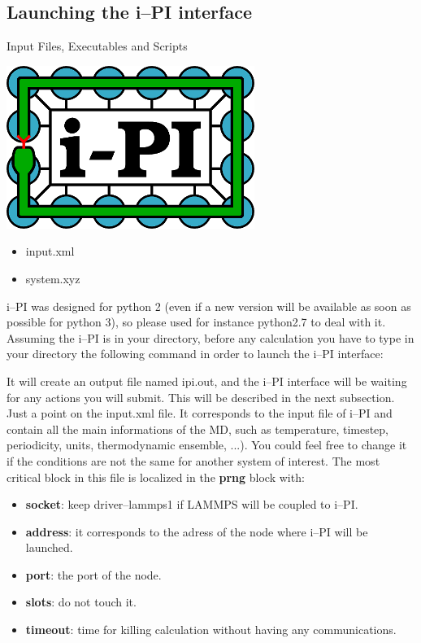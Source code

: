 \documentclass[12pt]{article}
\begin{document}
\subsection{Launching the i--PI interface}
\begin{mybox2}{{Input Files, Executables and Scripts}}
\begin{minipage}[c]{0.5\linewidth}
\includegraphics[scale=0.35]{ipi-logo-alpha.png}
\end{minipage}
\begin{minipage}[c]{0.5\linewidth}
\begin{itemize}
    \item input.xml
    \item system.xyz
\end{itemize}
\end{minipage}
\end{mybox2}
i--PI was designed for python 2 (even if a new version will be available as soon as possible for python 3), so please used for instance python2.7 to deal with it. Assuming the i--PI is in your directory, before any calculation you have to type in your directory the following command in order to launch the i--PI interface:
\begin{center}
\end{center}
It will create an output file named ipi.out, and the i--PI interface will be waiting for any actions you will submit. This will be described in the next subsection. \\
Just a point on the input.xml file. It corresponds to the input file of i--PI and contain all the main informations of the MD, such as temperature, timestep, periodicity, units, thermodynamic ensemble, ...). You could feel free to change it if the conditions are not the same for another system of interest. The most critical block in this file is localized in the \textbf{prng} block with:
\begin{itemize}
    \item \textbf{socket}: keep driver--lammps1 if LAMMPS will be coupled to i--PI.
    \item \textbf{address}: it corresponds to the adress of the node where i--PI will be launched.
    \item \textbf{port}: the port of the node.
    \item \textbf{slots}: do not touch it.
    \item \textbf{timeout}: time for killing calculation without having any communications.
\end{itemize}
\end{document}
